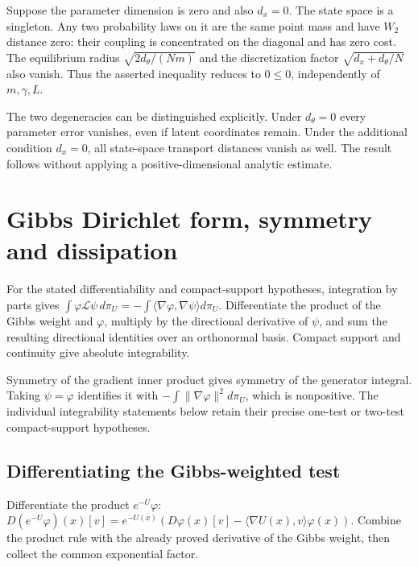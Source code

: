 \documentclass[11pt,a4paper]{article}
\begin{document}
Suppose the parameter dimension is zero and also \(d_x=0\). The state space is a singleton. Any two probability laws on it are the same point mass and have \(W_2\) distance zero: their coupling is concentrated on the diagonal and has zero cost. The equilibrium radius \(\sqrt{2d_\theta/(Nm)}\) and the discretization factor \(\sqrt{d_x+d_\theta/N}\) also vanish. Thus the asserted inequality reduces to \(0\le0\), independently of \(m,\gamma,L\).



The two degeneracies can be distinguished explicitly. Under \(d_\theta=0\) every parameter error vanishes, even if latent coordinates remain. Under the additional condition \(d_x=0\), all state-space transport distances vanish as well. The result follows without applying a positive-dimensional analytic estimate.



\section{\texorpdfstring{Gibbs Dirichlet form, symmetry and dissipation}{Gibbs Dirichlet form, symmetry and dissipation}}


For the stated differentiability and compact-support hypotheses, integration by parts gives \(\int\varphi\mathcal L\psi\,d\pi_U=-\int\langle\nabla\varphi,\nabla\psi\rangle d\pi_U\). Differentiate the product of the Gibbs weight and \(\varphi\), multiply by the directional derivative of \(\psi\), and sum the resulting directional identities over an orthonormal basis. Compact support and continuity give absolute integrability.



Symmetry of the gradient inner product gives symmetry of the generator integral. Taking \(\psi=\varphi\) identifies it with \(-\int\|\nabla\varphi\|^2d\pi_U\), which is nonpositive. The individual integrability statements below retain their precise one-test or two-test compact-support hypotheses.


\subsection{\texorpdfstring{Differentiating the Gibbs-weighted test}{Differentiating the Gibbs-weighted test}}


Differentiate the product \(e^{-U}\varphi\): \(D(e^{-U}\varphi)(x)[v]=e^{-U(x)}(D\varphi(x)[v]-\langle\nabla U(x),v\rangle\varphi(x))\). Combine the product rule with the already proved derivative of the Gibbs weight, then collect the common exponential factor.
\end{document}
